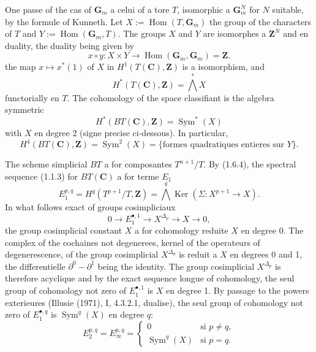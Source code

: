 \documentclass[11pt,a4paper]{article}
\theoremstyle{plain}
\theoremstyle{definition}
\DeclareMathOperator{\Sym}{Sym}
\DeclareMathOperator{\Hom}{Hom}
\DeclareMathOperator{\Ker}{Ker}
\begin{document}
One passe of the cas of $\mathbf{G}_m$ a celui of a tore $T$, isomorphic a $\mathbf{G}_m^N$ for $N$ suitable, by the formule of Kunneth. Let $X := \Hom(T, \mathbf{G}_m)$ the group of the characters of $T$ and $Y := \Hom(\mathbf{G}_m, T)$. The groups $X$ and $Y$ are isomorphes a $\mathbf{Z}^N$ and en duality, the duality being given by
\begin{equation}\label{1.6.3}
x \circ y : X \times Y \to \Hom(\mathbf{G}_m, \mathbf{G}_m) = \mathbf{Z}.
\end{equation}
the map $x \mapsto x^*(1)$ of $X$ in $H^1(T(\mathbf{C}), \mathbf{Z})$ is a isomorphism, and
\begin{equation}\label{1.6.4}
H^*(T(\mathbf{C}), \mathbf{Z}) = \bigwedge^* X
\end{equation}
functorially en $T$. The cohomology of the space classifiant is the algebra symmetric
\begin{equation}\label{1.6.5}
H^*(BT(\mathbf{C}), \mathbf{Z}) = \Sym^*(X)
\end{equation}
with $X$ en degree 2 (signe precise ci-dessous). In particular,
\begin{equation}\label{1.6.6}
H^4(BT(\mathbf{C}), \mathbf{Z}) = \Sym^2(X) = \{\text{formes quadratiques entieres sur } Y\}.
\end{equation}

The scheme simplicial $BT$ a for composantes $T^{n+1}/T$. By (1.6.4), the spectral sequence (1.1.3) for $BT(\mathbf{C})$ a for terme $E_1$
\begin{equation}\label{1.6.7}
E_1^{p,q} = H^q(T^{p+1}/T, \mathbf{Z}) = \bigwedge^q \Ker(\Sigma : X^{p+1} \to X).
\end{equation}
In what follows exact of groups cosimpliciaux
\[
0 \to E_1^{\bullet,1} \to X^{\Delta_p} \to X \to 0,
\]
the group cosimplicial constant $X$ a for cohomology reduite $X$ en degree 0. The complex of the cochaines not degenerees, kernel of the operateurs of degenerescence, of the group cosimplicial $X^{\Delta_p}$ is reduit a $X$ en degrees 0 and 1, the differentielle $\partial^0 - \partial^1$ being the identity. The group cosimplicial $X^{\Delta_p}$ is therefore acyclique and by the exact sequence longue of cohomology, the seul group of cohomology not zero of $E_1^{\bullet,1}$ is $X$ en degree 1. By passage to the powers exterieures (Illusie (1971), I, 4.3.2.1, dualise), the seul group of cohomology not zero of $E_1^{\bullet,q}$ is $\Sym^q(X)$ en degree $q$:
\begin{equation}\label{1.6.8}
E_2^{p,q} = E_\infty^{p,q} =
\begin{cases}
0 & \text{si } p \neq q, \\
\Sym^q(X) & \text{si } p = q.
\end{cases}
\end{equation}
\end{document}
